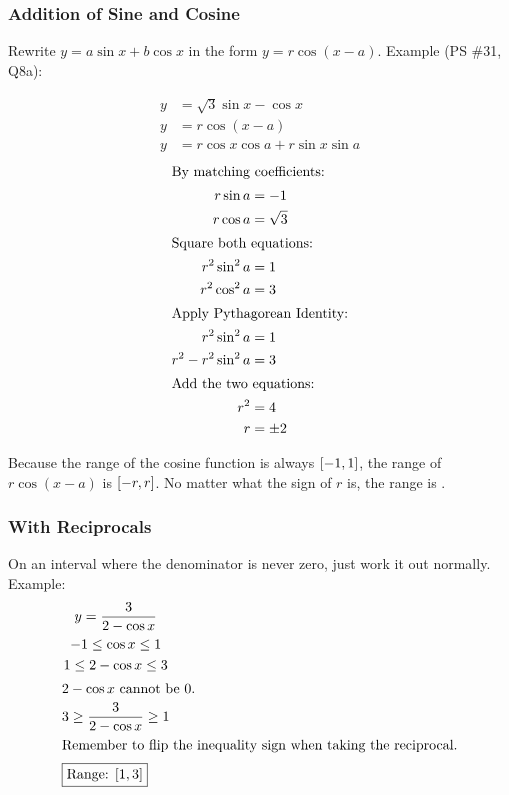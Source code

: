 \documentclass{article}
\begin{document}
\subsubsection{Addition of Sine and Cosine}
Rewrite $y=a\sin x+b\cos x$ in the form $y=r\cos\left(x-a\right)$. Example (PS \#31, Q8a):
\begin{multicols}{2}
\begin{align*}
	y&=\sqrt{3}\sin x-\cos x \\
	y&=r\cos\left(x-a\right) \\
	y&=r\cos x\cos a+r\sin x\sin a
\end{align*}
\begin{align*}
	\intertext{By matching coefficients:}
	r\sin a&=-1 \\
	r\cos a&=\sqrt{3} \\
	\intertext{Square both equations:}
	r^2\sin^2a&=1 \\
	r^2\cos^2a&=3 \\
	\intertext{Apply Pythagorean Identity:}
	r^2\sin^2a&=1 \\
	r^2-r^2\sin^2a&=3 \\
	\intertext{Add the two equations:}
	r^2&=4 \\
	r&=\pm2
\end{align*}
\end{multicols}

Because the range of the cosine function is always
$\interval[scaled]{-1}{1}$, the range of $r\cos\left(x-a\right)$
is $\interval[scaled]{-r}{r}$. No matter what the sign of $r$ is,
the range is .

\subsubsection{With Reciprocals}
On an interval where the denominator is never zero, just work it
out normally. Example:
\begin{gather*}
	y=\frac{3}{2-\cos x} \\
	-1\leq\cos x\leq1 \\
	1\leq2-\cos x\leq3 \\
	\intertext{\centering{$2-\cos x$ cannot be 0.}}
	3\geq\frac{3}{2-\cos x}\geq1 \\
	\intertext{\centering{Remember to flip the inequality sign
		when taking the reciprocal.}}
	\intertext{\centering{\boxed{\text{Range: }\interval[scaled]{1}{3}}}}
\end{gather*}
\end{document}
